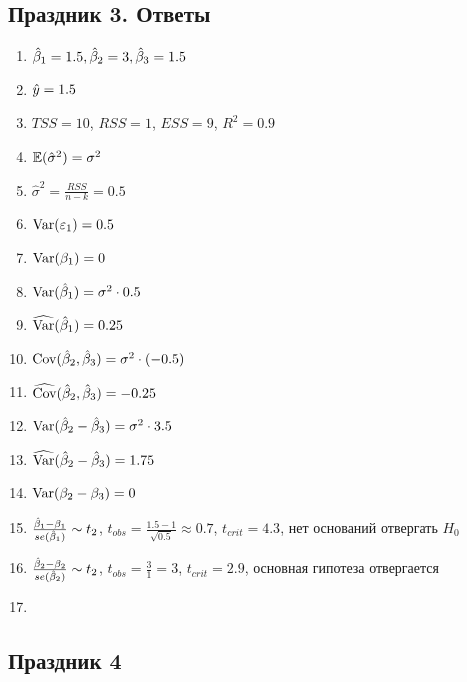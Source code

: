 \documentclass[12pt, a4paper]{article}\usepackage[]{graphicx}\usepackage[]{color}
\begin{document}
\subsection{Праздник 3. Ответы}
\begin{enumerate}
\item $\hat{\beta}_1 = 1.5, \hat{\beta}_2 = 3, \hat{\beta}_3 = 1.5$
\item $\hat{y} = 1.5$
\item $TSS = 10$, $RSS = 1$, $ESS = 9$, $R^2 = 0.9$
\item $\mathbb{E} (\hat{\sigma}^2) = \sigma^2$
\item $\hat{\sigma}^2 = \frac{RSS}{n-k} = 0.5$
\item $\operatorname{Var}(\varepsilon_1) = 0.5$
\item $\operatorname{Var} (\beta_1) = 0$
\item $\operatorname{Var} (\hat{\beta}_1) = \sigma^2 \cdot 0.5$
\item $\widehat{\operatorname{Var} }(\hat{\beta}_1) = 0.25$
\item $\operatorname{Cov} (\hat{\beta}_2, \hat{\beta}_3) = \sigma^2 \cdot (-0.5)$
\item $\widehat{\operatorname{Cov} }(\hat{\beta}_2, \hat{\beta}_3) = -0.25$
\item $\operatorname{Var} (\hat{\beta}_2 - \hat{\beta}_3) = \sigma^2 \cdot 3.5$
\item $\widehat{\operatorname{Var} }(\hat{\beta}_2 - \hat{\beta}_3) = 1.75$
\item $\operatorname{Var} (\beta_2 - \beta_3) = 0$
\item $\frac{\hat{\beta}_1 - \beta_1}{se(\hat{\beta}_1)} \sim t_2$, $t_{obs} = \frac{1.5-1}{\sqrt{0.5}} \approx 0.7$, $t_{crit} = 4.3$, нет оснований отвергать $H_0$
\item $\frac{\hat{\beta}_2 - \beta_2}{se(\hat{\beta}_2)} \sim t_2$, $t_{obs} = \frac{3}{1} = 3$, $t_{crit} = 2.9$, основная гипотеза отвергается
\item
\end{enumerate}



\subsection{Праздник 4}
\end{document}
